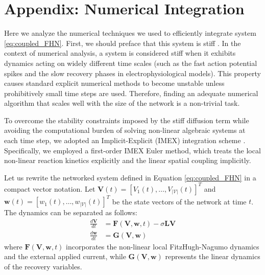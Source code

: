 
\chapter{Appendix: Numerical Integration}
\label{app:A}
Here we analyze the numerical techniques we used to efficiently integrate system \eqref{eq:coupled_FHN}.
First, we should preface that this system is stiff \cite{hairer1996solving}. In the context of numerical analysis, a system is considered stiff when it exhibits dynamics acting on widely different time scales (such as the fast action potential spikes and the slow recovery phases in electrophysiological models). This property causes standard explicit numerical methods to become unstable unless prohibitively small time steps are used. Therefore, finding an adequate numerical algorithm that scales well with the size of the network is a non-trivial task.

To overcome the stability constraints imposed by the stiff diffusion term while avoiding the computational burden of solving non-linear algebraic systems at each time step, we adopted an Implicit-Explicit (IMEX) integration scheme \cite{ascher1995implicit, hundsdorfer2003numerical}. Specifically, we employed a first-order IMEX Euler method, which treats the local non-linear reaction kinetics explicitly and the linear spatial coupling implicitly. 

Let us rewrite the networked system defined in Equation \eqref{eq:coupled_FHN} in a compact vector notation. Let $\mathbf{V}(t) = [V_1(t), \dots, V_{|\mathcal{V}|}(t)]^T$ and $\mathbf{w}(t) = [w_1(t), \dots, w_{|\mathcal{V}|}(t)]^T$ be the state vectors of the network at time $t$. The dynamics can be separated as follows:
\begin{equation}
\label{eq:vector_system}
\begin{aligned}
\frac{d\mathbf{V}}{dt} &= \mathbf{F}(\mathbf{V}, \mathbf{w}, t) - \sigma \mathbf{L} \mathbf{V} \\
\frac{d\mathbf{w}}{dt} &= \mathbf{G}(\mathbf{V}, \mathbf{w})
\end{aligned}
\end{equation}
where $\mathbf{F}(\mathbf{V}, \mathbf{w}, t)$ incorporates the non-linear local FitzHugh-Nagumo dynamics and the external applied current, while $\mathbf{G}(\mathbf{V}, \mathbf{w})$ represents the linear dynamics of the recovery variables.

